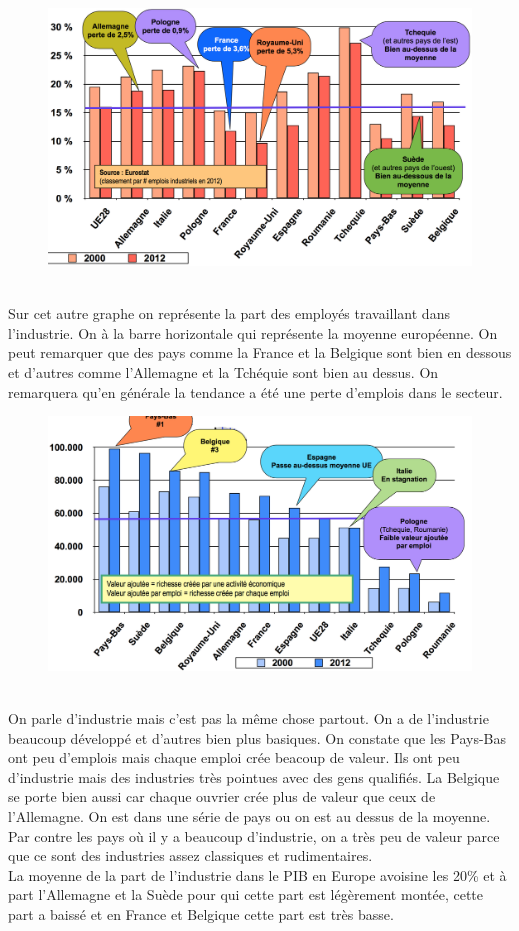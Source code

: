 \begin{figure}
\includegraphics[scale=0.3]{67}
\end{figure}
\ \\
Sur cet autre graphe on représente la part des employés travaillant dans l'industrie. On à la barre horizontale qui représente la moyenne européenne. On peut remarquer que des pays comme la France et la Belgique sont bien en dessous et d'autres comme l'Allemagne et la Tchéquie sont bien au dessus. On remarquera qu'en générale la tendance a été une perte d'emplois dans le secteur. 

\begin{figure}
\includegraphics[scale=0.29]{68}
\end{figure}
\ \\
On parle d’industrie mais c’est pas la même chose partout. On a de l’industrie beaucoup développé et d’autres bien plus basiques. On constate que les Pays-Bas ont peu d’emplois mais chaque emploi crée beacoup de valeur. Ils ont peu d’industrie mais des industries très pointues avec des gens qualifiés. La Belgique se porte bien aussi car chaque ouvrier crée plus de valeur que ceux de l’Allemagne. On est dans une série de pays ou on est au dessus de la moyenne. Par contre les pays où il y a beaucoup d’industrie, on a très peu de valeur parce que ce sont des industries assez classiques et rudimentaires. \\
La moyenne de la part de l'industrie dans le PIB en Europe avoisine les 20\% et à part l'Allemagne et la Suède pour qui cette part est légèrement montée, cette part a baissé et en France et Belgique cette part est très basse.

